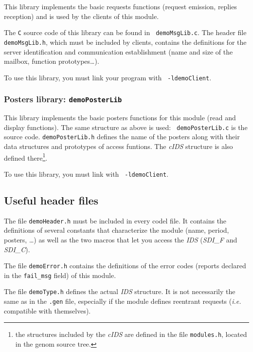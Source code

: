 This library implements  the basic requests  functions (request emission,
replies reception) and is used by the clients of this module.

The {\tt   C}  source code    of  this  library  can be   found  in  {\tt
demoMsgLib.c}.  The header
file {\tt demoMsgLib.h}, which must  be included by clients, contains the
definitions for the server identification and communication establishment
(name and size of the mailbox, function prototypes\ldots).

To use this  library, you must link your  program with  {\tt
-ldemoClient}. 


\subsubsection{Posters library: {\tt demoPosterLib}}

This library implements the basic posters functions for this module (read
and display   functions).  The same    structure as above  is used:  {\tt
demoPosterLib.c} is  the  source code. 
{\tt demoPosterLib.h}   defines the name  of  the
posters along  with  their data structures and prototypes of access
funtions.
The  {\em cIDS} structure is
also defined there\footnote{the structures included by the {\em cIDS} are
defined in the file {\tt modules.h}, located in the genom source tree.}.

To  use this library,  you must link  with  {\tt 
-ldemoClient}.


\subsection{Useful header files}

The file {\tt  demoHeader.h} must  be included  in every  codel file.  It
contains the definitions of several constants that characterize the module
(name, period, posters, \ldots)  as well as the two  macros that let  you
access the {\em IDS} ({\em SDI\_F} and {\em SDI\_C}).

The file  {\tt demoError.h} contains the  definitions of the  error codes
(reports declared in the {\tt fail\_msg} field) of this module.

The file {\tt  demoType.h} defines the actual {\em  IDS} structure. It is
not necessarily the same as  in the  {\tt .gen}  file, especially if  the
module   defines   reentrant   requests   ({\em  i.e.}   compatible  with
themselves).

